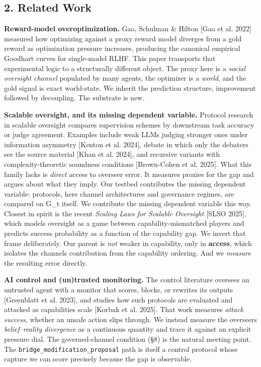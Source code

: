 \documentclass[11pt]{article}
\begin{document}
\subsection{2. Related Work}\label{2-related-work}

\textbf{Reward-model overoptimization.} Gao, Schulman \& Hilton {[}Gao
et al. 2022{]} measured how optimizing against a proxy reward model
diverges from a gold reward as optimization pressure increases,
producing the canonical empirical Goodhart curves for single-model RLHF.
This paper transports that experimental logic to a structurally
different object. The proxy here is a \emph{social oversight channel}
populated by many agents, the optimizer is a \emph{world}, and the gold
signal is exact world-state. We inherit the prediction structure, improvement followed
by decoupling. The substrate is new.

\textbf{Scalable oversight, and its missing dependent variable.}
Protocol research in scalable oversight compares supervision schemes by
downstream task accuracy or judge agreement. Examples include weak LLMs
judging stronger ones under information asymmetry {[}Kenton et al.
2024{]}, debate in which only the debaters see the source material
{[}Khan et al. 2024{]}, and recursive variants with complexity-theoretic
soundness conditions {[}Brown-Cohen et al. 2025{]}. What this family
lacks is \emph{direct} access to overseer error. It measures proxies for
the gap and argues about what they imply. Our testbed contributes the
missing dependent variable: protocols, here channel architectures and
governance regimes, are compared on G\_t itself. We contribute the
missing dependent variable this way. Closest in spirit is the recent
\emph{Scaling Laws for Scalable Oversight} {[}SLSO 2025{]}, which models
oversight as a game between capability-mismatched players and predicts
success probability as a function of the capability gap. We invert that
frame deliberately. Our parent is \emph{not} weaker in capability, only
in \textbf{access}, which isolates the channel\textquotesingle s
contribution from the capability ordering. And we \emph{measure} the
resulting error directly.

\textbf{AI control and (un)trusted monitoring.} The control literature
oversees an untrusted agent with a monitor that scores, blocks, or
rewrites its outputs {[}Greenblatt et al. 2023{]}, and studies how such
protocols are evaluated and attacked as capabilities scale {[}Korbak et
al. 2025{]}. That work measures \emph{attack success}, whether an unsafe
action slips through. We instead measure the overseer\textquotesingle s
\emph{belief--reality divergence} as a continuous quantity and trace it
against an explicit pressure dial. The governed-channel condition (§8)
is the natural meeting point. The
\texttt{bridge\_modification\_proposal} path is itself a control
protocol whose capture we can score precisely because the gap is
observable.
\end{document}
